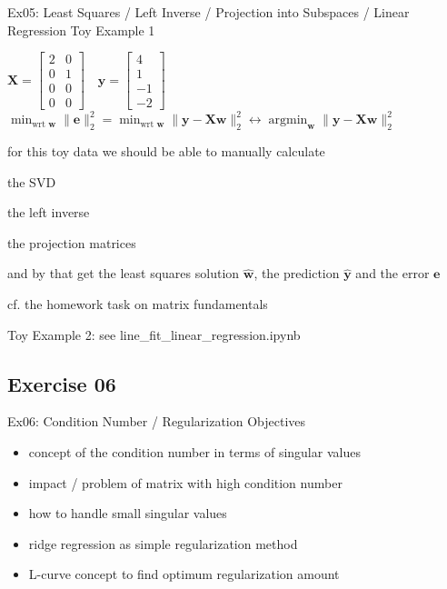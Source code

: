 \documentclass[mathserif, aspectratio=1610]{intbeamer}
\begin{document}
\begin{frame}{Ex05: Least Squares / Left Inverse / Projection into Subspaces / Linear Regression}
%
Toy Example 1

$
\bm{X}=
\begin{bmatrix}
2 & 0 \\ 0 & 1 \\ 0 & 0 \\ 0 & 0
\end{bmatrix}\quad
\bm{y} =
\begin{bmatrix}
4 \\ 1 \\ -1 \\ -2
\end{bmatrix}
$
%
\qquad
%
$\min_{\text{wrt }\bm{w}} \lVert\bm{e}\rVert_2^2 = \min_{\text{wrt }\bm{w}} \lVert\bm{y} - \bm{X} \bm{w}\rVert_2^2
\leftrightarrow
\operatorname*{argmin}_{\bm{w}} \lVert\bm{y} - \bm{X} \bm{w}\rVert_2^2
$

\vspace{1em}

for this toy data we should be able to manually calculate

the SVD

the left inverse

the projection matrices

and by that get the least squares solution $\hat{\bm{w}}$, the prediction $\hat{\bm{y}}$ and the error $\bm{e}$

cf. the homework task on matrix fundamentals

\vspace{1em}
Toy Example 2: see line\_fit\_linear\_regression.ipynb

\addvspace{100mm}

\end{frame}











\subsection{Exercise 06}
\begin{frame}{Ex06: Condition Number / Regularization}
Objectives
\begin{itemize}
\item concept of the condition number in terms of singular values
\item impact / problem of matrix with high condition number
\item how to handle small singular values
\item ridge regression as simple regularization method
\item L-curve concept to find optimum regularization amount
\end{itemize}
\end{frame}
\end{document}
